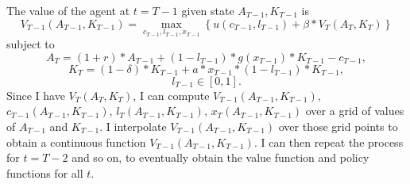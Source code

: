 \documentclass[12pt]{article}
\begin{document}
The value of the agent at $t = T-1$ given state $A_{T-1}, K_{T-1}$ is
\begin{equation}
    V_{T-1}(A_{T-1}, K_{T-1}) = \max_{c_{T-1}, l_{T-1}, x_{T-1}} \left\{ u(c_{T-1}, l_{T-1}) + \beta*V_{T}(A_{T}, K_{T}) \right\}
\end{equation}
subject to
\begin{equation}
    A_{T} = (1+r)*A_{T-1} + (1-l_{T-1})*g(x_{T-1})*K_{T-1} - c_{T-1},
\end{equation}
\begin{equation}
    K_{T} = (1-\delta)*K_{T-1} + a*x_{T-1}*(1-l_{T-1})*K_{T-1},
\end{equation}
\begin{equation}
    l_{T-1} \in [0,1].
\end{equation}
Since I have $V_T(A_T, K_T)$, I can compute $V_{T-1}(A_{T-1}, K_{T-1})$, $c_{T-1}(A_{T-1}, K_{T-1})$, $l_T(A_{T-1}, K_{T-1})$, $x_T(A_{T-1}, K_{T-1})$ over a grid of values of $A_{T-1}$ and $K_{T-1}$.
I interpolate $V_{T-1}(A_{T-1}, K_{T-1})$ over those grid points to obtain a continuous function $V_{T-1}(A_{T-1}, K_{T-1})$.
I can then repeat the process for $t = T-2$ and so on, to eventually obtain the value function and policy functions for all $t$.

\printbibliography
\end{document}
